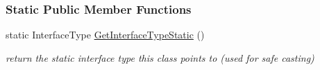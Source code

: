 \subsubsection*{Static Public Member Functions}
\begin{DoxyCompactItemize}
\item 
\hypertarget{classOpenRAVE_1_1KinBody_affeafe65e7c4094f282d273dedbf069b}{
static InterfaceType \hyperlink{classOpenRAVE_1_1KinBody_affeafe65e7c4094f282d273dedbf069b}{GetInterfaceTypeStatic} ()}
\label{classOpenRAVE_1_1KinBody_affeafe65e7c4094f282d273dedbf069b}

\begin{DoxyCompactList}\small\item\em return the static interface type this class points to (used for safe casting) \item\end{DoxyCompactList}\end{DoxyCompactItemize}
